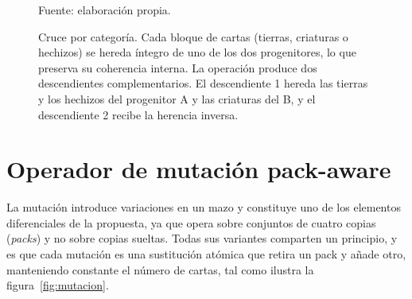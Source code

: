 \begin{figure}[H]
\centering
{}
\caption{Cruce por categoría. Cada bloque de cartas (tierras, criaturas o hechizos) se hereda íntegro de uno de los dos progenitores, lo que preserva su coherencia interna. La operación produce dos descendientes complementarios. El descendiente 1 hereda las tierras y los hechizos del progenitor A y las criaturas del B, y el descendiente 2 recibe la herencia inversa.}
\label{fig:cruce}
\vspace{2pt}
{\footnotesize Fuente: elaboración propia.}
\end{figure}

\section{Operador de mutación pack-aware}
\label{sec:mutacion}

La mutación introduce variaciones en un mazo y constituye uno de los elementos diferenciales de la propuesta, ya que opera sobre conjuntos de cuatro copias (\emph{packs}) y no sobre copias sueltas. Todas sus variantes comparten un principio, y es que cada mutación es una sustitución atómica que retira un pack y añade otro, manteniendo constante el número de cartas, tal como ilustra la figura~\ref{fig:mutacion}.

